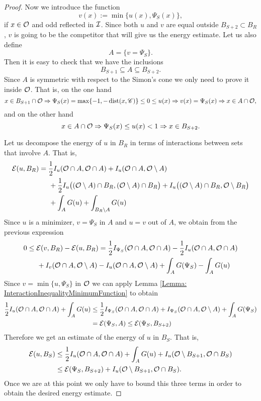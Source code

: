 \begin{proof}
Now we introduce the function
$$ v(x) := \min\{u(x),\Psi_S(x)\}, $$
if $x\in \mathcal{O}$ and odd reflected in $\mathcal{I}$. Since both $u$ and $v$ are equal outside $B_{S+2} \subset B_R$, $v$ is going to be the competitor that will give us the energy estimate. Let us also define
$$ A = \{v=\Psi_S\}. $$
Then it is easy to check that we have the inclusions
$$ B_{S+1} \subseteq A \subseteq B_{S+2}. $$
Since $A$ is symmetric with respect to the Simon's cone we only need to prove it inside $\mathcal{O}$. That is, on the one hand
$$ x\in B_{S+1}\cap \mathcal{O} \Rightarrow \Psi_S(x) = \max\{-1,-\operatorname{dist}(x,\mathscr{C})\} \leq 0 \leq u(x) \Rightarrow v(x) = \Psi_S(x)  \Rightarrow x\in A\cap \mathcal{O},  $$
and on the other hand
$$ x\in A\cap \mathcal{O} \Rightarrow \Psi_S(x) \leq u(x) < 1 \Rightarrow x\in B_{S+2}.  $$

Let us decompose the energy of $u$ in $B_R$ in terms of interactions between sets that involve $A$. That is,
\begin{align*}
\mathcal{E}(u,B_R) &= \frac{1}{2}I_u(\mathcal{O} \cap A, \mathcal{O} \cap A) + I_u(\mathcal{O} \cap A, \mathcal{O} \setminus A) \\
& \hspace{5mm} + \frac{1}{2}I_u\big((\mathcal{O} \setminus A) \cap B_R, (\mathcal{O} \setminus A) \cap B_R\big) + I_u\big((\mathcal{O} \setminus A) \cap B_R, \mathcal{O} \setminus B_R\big) \\
& \hspace{5mm} + \int_A G(u) + \int_{B_R\setminus A} G(u)
\end{align*}
Since $u$ is a minimizer, $v=\Psi_S$ in $A$ and $u=v$ out of $A$, we obtain from the previous expression
\begin{align*}
0 &\leq \mathcal{E}(v,B_R)-\mathcal{E}(u,B_R) = \frac{1}{2}I_{\Psi_S}(\mathcal{O} \cap A, \mathcal{O} \cap A) - \frac{1}{2}I_u(\mathcal{O} \cap A, \mathcal{O} \cap A)\\
& \hspace{5mm} + I_v(\mathcal{O} \cap A, \mathcal{O} \setminus A) - I_u(\mathcal{O} \cap A, \mathcal{O} \setminus A) + \int_A G(\Psi_S) - \int_{A} G(u)
\end{align*}
Since $v = \min\{u,\Psi_S\}$ in $\mathcal{O}$ we can apply Lemma \ref{Lemma: InteractionInequalityMinimumFunction} to obtain
\begin{align*}
\frac{1}{2}I_u(\mathcal{O} \cap A, \mathcal{O} \cap A) + \int_{A} G(u) &\leq \frac{1}{2}I_{\Psi_S}(\mathcal{O} \cap A, \mathcal{O} \cap A) + I_{\Psi_S}(\mathcal{O} \cap A, \mathcal{O} \setminus A) + \int_A G(\Psi_S)  \\
&= \mathcal{E}(\Psi_S, A) \leq \mathcal{E}(\Psi_S,B_{S+2})
\end{align*}
Therefore we get an estimate of the energy of $u$ in $B_S$. That is,
\begin{align*}
\mathcal{E}(u,B_S) &\leq \frac{1}{2}I_u(\mathcal{O} \cap A, \mathcal{O} \cap A) + \int_{A} G(u) + I_u(\mathcal{O} \setminus B_{S+1}, \mathcal{O} \cap B_S) \\
& \leq  \mathcal{E}(\Psi_S,B_{S+2}) + I_u(\mathcal{O} \setminus B_{S+1}, \mathcal{O} \cap B_S).
\end{align*}
Once we are at this point we only have to bound this three terms in order to obtain the desired energy estimate.


\end{proof}
